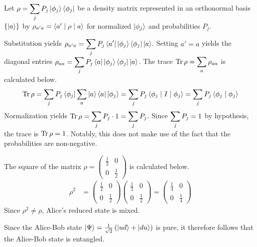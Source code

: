 \begin{answer}
	Let $\displaystyle \rho = \sum_j P_j \ket{\phi_j} \bra{\phi_j}$ be a density matrix represented in an orthonormal basis $\left\{\ket{a}\right\}$ by $\rho_{a' a} = \braket{a' \mid \rho \mid a}$ for normalized $\ket{\phi_j}$ and probabilities $P_j$.

	Substitution yields $\displaystyle \rho_{a' a} = \sum_j P_j \bra{a'} \ket{\phi_j} \bra{\phi_j} \ket{a}$.
	Setting $a' = a$ yields the diagonal entries $\displaystyle \rho_{a a} = \sum_j P_j \bra{a} \ket{\phi_j} \bra{\phi_j} \ket{a}$.
	The trace $\displaystyle \operatorname{Tr} \rho = \sum_a \rho_{a a}$ is calculated below.
	\begin{align}
		\operatorname{Tr} \rho = \sum_j P_j \bra{\phi_j} \sum_a \ket{a} \bra{a} \ket{\phi_j} = \sum_j P_j \braket{\phi_j \mid I \mid \phi_j} = \sum_j P_j \braket{\phi_j \mid \phi_j}
	\end{align}
	Normalization yields $\displaystyle \operatorname{Tr} \rho = \sum_j P_j \cdot 1 = \sum_j P_j$.
	Since $\displaystyle \sum_j P_j = 1$ by hypothesis, the trace is $\displaystyle \operatorname{Tr} \rho = 1$.
	Notably, this does not make use of the fact that the probabilities are non-negative.
\end{answer}

\begin{answer}[Entanglement]
	The square of the matrix $\rho = \begin{pmatrix} \frac{1}{2} & 0 \\ 0 & \frac{1}{2} \end{pmatrix}$ is calculated below.
	\begin{align}
		\rho^2 & =
		\begin{pmatrix}
			\frac{1}{2} & 0           \\
			0           & \frac{1}{2}
		\end{pmatrix}
		\begin{pmatrix}
			\frac{1}{2} & 0           \\
			0           & \frac{1}{2}
		\end{pmatrix}
		=
		\begin{pmatrix}
			\frac{1}{4} & 0           \\
			0           & \frac{1}{4}
		\end{pmatrix}
	\end{align}
	Since $\rho^2 \neq \rho$, Alice's reduced state is mixed.

	Since the Alice-Bob state $\ket{\Psi} = \frac{1}{\sqrt{2}} \left(\ket{u d} + \ket{d u}\right)$ is pure, it therefore follows that the Alice-Bob state is entangled.
\end{answer}

